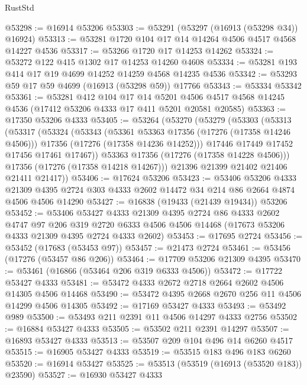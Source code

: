 \begin{lexlean}{RustStd}
\begin{coremodule}
@53298 := @16914 @53206
@53303 := @53291 (@53297 (@16913 (@53298 @34)) @16924)
@53313 := @53281 @1720 @104 @17 @14 @14264 @4506 @4517 @4568 @14227 @4536
@53317 := @53266 @1720 @17 @14253 @14262
@53324 := @53272 @122 @415 @1302 @17 @14253 @14260 @4608
@53334 := @53281 @193 @414 @17 @19 @4699 @14252 @14259 @4568 @14235 @4536
@53342 := @53293 @59 @17 @59 @4699 (@16913 (@53298 @59)) @17766
@53343 := @53334 @53342
@53361 := @53281
    @412
    @104
    @17
    @14
    @5201
    @4506
    @4517
    @4568
    @14245
    @4536
    (@17412 @53206 @4333 @17 @411 @5201 @20581 @20585)
@53363 := @17350 @53206 @4333
@53405 := @53264
    (@53270
      (@53279
        (@53303
          (@53313
            (@53317
              (@53324
                (@53343
                  (@53361 @53363 @17356 (@17276 (@17358 @14246 @4506)))
                  @17356
                  (@17276 (@17358 @14236 @14252)))
                @17446
                @17449
                @17452
                @17456
                @17461
                @17467))
            @53363
            @17356
            (@17276 (@17358 @14228 @4506)))
          @17356
          (@17276 (@17358 @14218 @14267)))
        @21396
        @21399
        @21402
        @21406
        @21411
        @21417))
@53406 := @17624 @53206
@53423 := @53406
    @53206
    @4333
    @21309
    @4395
    @2724
    @303
    @4333
    @2602
    @14472
    @34
    @214
    @86
    @2664
    @4874
    @4506
    @4506
    @14290
@53427 := @16838 (@19433 (@21439 @19434)) @53206
@53452 := @53406
    @53427
    @4333
    @21309
    @4395
    @2724
    @86
    @4333
    @2602
    @4747
    @97
    @206
    @319
    @2720
    @6333
    @4506
    @4506
    @14468
    (@17673 @53206 @4333 @21309 @4395 @2724 @4333 @2602)
@53453 := @17695 @2724
@53456 := @53452 (@17683 (@53453 @97))
@53457 := @21473 @2724
@53461 := @53456 (@17276 (@53457 @86 @206))
@53464 := @17709 @53206 @21309 @4395
@53470 := @53461 (@16866 (@53464 @206 @319 @6333 @4506))
@53472 := @17722 @53427 @4333
@53481 := @53472 @4333 @2672 @2718 @2664 @2602 @4506 @14305 @4506 @14468
@53490 := @53472 @4395 @2668 @2670 @256 @11 @4506 @14299 @4506 @14305
@53492 := @17169 @53427 @4333
@53493 := @53492 @989
@53500 := @53493 @211 @2391 @11 @4506 @14297 @4333 @2756
@53502 := @16884 @53427 @4333
@53505 := @53502 @211 @2391 @14297
@53507 := @16893 @53427 @4333
@53513 := @53507 @209 @104 @496 @14 @6260 @4517
@53515 := @16905 @53427 @4333
@53519 := @53515 @183 @496 @183 @6260
@53520 := @16914 @53427
@53525 := @53513 (@53519 (@16913 (@53520 @183)) @23590)
@53527 := @16930 @53427 @4333

\end{coremodule}
\end{lexlean}
